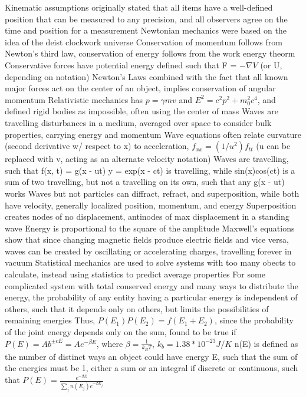 \documentclass[11 pt, twoside]{article}
\newenvironment{outline*}
{
	\begin{outline}[enumerate]
	}
	{\end{outline}
}
\begin{document}
\begin{outline*}
\1 Kinematic assumptions originally stated that all items have a well-defined position that can be measured to any precision, and all observers agree on the time and position for a measurement
\1 Newtonian mechanics were based on the idea of the deist clockwork universe
	\2 Conservation of momentum follows from Newton's third law, conservation of energy follows from the work energy theorm
	\2 Conservative forces have potential energy defined such that F = $-\nabla V$ (or U, depending on notation)
	\2 Newton's Laws combined with the fact that all known major forces act on the center of an object, implies conservation of angular momentum
\1 Relativistic mechanics has $p = \gamma mv$ and $E^2 = c^2p^2 + m_0^2c^4$, and defined rigid bodies as impossible, often using the center of mass
\1 Waves are travelling disturbances in a medium, averaged over space to consider bulk properties, carrying energy and momentum
	\2 Wave equations often relate curvature (second derivative w/ respect to x) to acceleration, $f_{xx} = (1/u^2) f_{tt}$ (u can be replaced with v, acting as an alternate velocity notation)
	\2 Waves are travelling, such that f(x, t) = g(x - ut)
	\2 y = exp(x - ct) is travelling, while sin(x)cos(ct) is a sum of two travelling, but not a travelling on its own, such that any g(x - ut) works
\1 Waves but not particles can diffract, refract, and superposition, while both have velocity, generally localized position, momentum, and energy
	\2 Superposition creates nodes of no displacement, antinodes of max displacement in a standing wave
	\2 Energy is proportional to the square of the amplitude
\1 Maxwell's equations show that since changing magnetic fields produce electric fields and vice versa, waves can be created by oscillating or accelerating charges, travelling forever in vacuum
\1 Statistical mechanics are used to solve systems with too many obects to calculate, instead using statistics to predict average properties
	\2 For some complicated system with total conserved energy and many ways to distribute the energy, the probability of any entity having a particular energy is independent of others, such that it depends only on others, but limits the possibilities of remaining energies
		\3 Thus, $P(E_1)P(E_2) = f(E_1 + E_2)$, since the probability of the joint energy depends only on the sum, found to be true if $P(E) = Ab^{\pm cE} = Ae^{-\beta E}$, where $\beta = \frac{1}{k_BT}$, $k_b = 1.38 * 10^{-23} J/K$
		\3 n(E) is defined as the number of distinct ways an object could have energy E, such that the sum of the energies must be 1, either a sum or an integral if discrete or continuous, such that $P(E) = \frac{e^{-\beta E}}{\sum_j n(E_j) e^{-\beta E_j}}$

\end{outline*}
\end{document}
